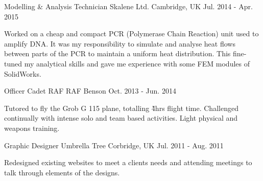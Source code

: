 \begin{cventries}
    \cventry
        {Modelling \& Analysis Technician}
        {Skalene Ltd.}
        {Cambridge, UK}
        {Jul. 2014 - Apr. 2015}
        {
            \begin{cvitems}
                \item{Worked on a cheap and compact PCR (Polymerase Chain Reaction) unit used to amplify DNA. It was my responsibility to simulate and analyse heat flows between parts of the PCR to maintain a uniform heat distribution. This fine-tuned my analytical skills and gave me experience with some FEM modules of SolidWorks.}
            \end{cvitems}
        }


    \cventry
        {Officer Cadet}
        {RAF}
        {RAF Benson}
        {Oct. 2013 - Jun. 2014}
        {
            \begin{cvitems}
                \item{Tutored to fly the Grob G 115 plane, totalling \~4hrs flight time. Challenged continually with intense solo and team based activities. Light physical and weapons training.}
            \end{cvitems}
        }


    \cventry
        {Graphic Designer}
        {Umbrella Tree}
        {Corbridge, UK}
        {Jul. 2011 - Aug. 2011}
        {
            \begin{cvitems}
                \item{Redesigned existing websites to meet a clients needs and attending meetings to talk through elements of the designs.}
            \end{cvitems}
        }

\end{cventries}